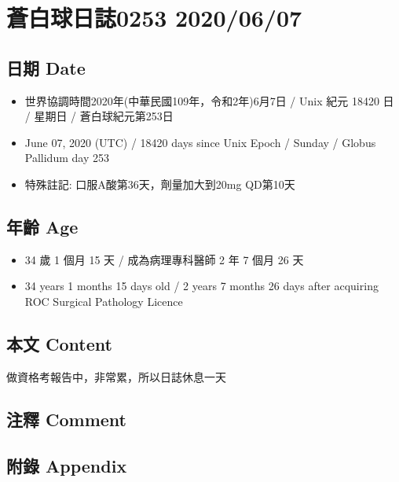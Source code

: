 \documentclass[a5paper, 11pt
]{book}
\providecommand{\tightlist}{%
  \setlength{\itemsep}{0pt}\setlength{\parskip}{0pt}}
\begin{document}
\hypertarget{ux84bcux767dux7403ux65e5ux8a8c0253-20200607}{%
\section{蒼白球日誌0253
2020/06/07}\label{ux84bcux767dux7403ux65e5ux8a8c0253-20200607}}

\hypertarget{ux65e5ux671f-date-6}{%
\subsection{日期 Date}\label{ux65e5ux671f-date-6}}

\begin{itemize}
\tightlist
\item
  世界協調時間2020年(中華民國109年，令和2年)6月7日 / Unix 紀元 18420 日
  / 星期日 / 蒼白球紀元第253日
\item
  June 07, 2020 (UTC) / 18420 days since Unix Epoch / Sunday / Globus
  Pallidum day 253
\item
  特殊註記: 口服A酸第36天，劑量加大到20mg QD第10天
\end{itemize}

\hypertarget{ux5e74ux9f61-age-6}{%
\subsection{年齡 Age}\label{ux5e74ux9f61-age-6}}

\begin{itemize}
\tightlist
\item
  34 歲 1 個月 15 天 / 成為病理專科醫師 2 年 7 個月 26 天
\item
  34 years 1 months 15 days old / 2 years 7 months 26 days after
  acquiring ROC Surgical Pathology Licence
\end{itemize}

\hypertarget{ux672cux6587-content-6}{%
\subsection{本文 Content}\label{ux672cux6587-content-6}}

做資格考報告中，非常累，所以日誌休息一天

\hypertarget{ux6ce8ux91cb-comment-6}{%
\subsection{注釋 Comment}\label{ux6ce8ux91cb-comment-6}}

\hypertarget{ux9644ux9304-appendix-6}{%
\subsection{附錄 Appendix}\label{ux9644ux9304-appendix-6}}
\end{document}
